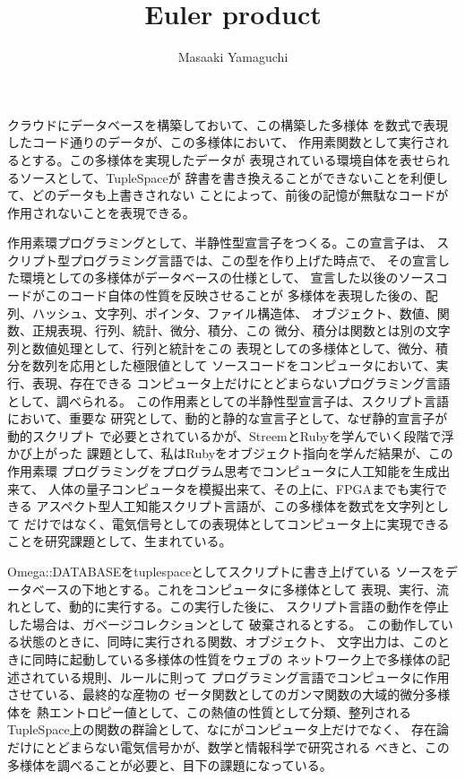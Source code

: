 \documentclass{jsarticle}
\begin{document}
\title{Euler product}
\author{Masaaki Yamaguchi}
\date{}
\maketitle



  クラウドにデータベースを構築しておいて、この構築した多様体
  を数式で表現したコード通りのデータが、この多様体において、
  作用素関数として実行されるとする。この多様体を実現したデータが
  表現されている環境自体を表せられるソースとして、TupleSpaceが
  辞書を書き換えることができないことを利便して、どのデータも上書きされない
  ことによって、前後の記憶が無駄なコードが作用されないことを表現できる。

  作用素環プログラミングとして、半静性型宣言子をつくる。この宣言子は、
  スクリプト型プログラミング言語では、この型を作り上げた時点で、
  その宣言した環境としての多様体がデータベースの仕様として、
  宣言した以後のソースコードがこのコード自体の性質を反映させることが
  多様体を表現した後の、配列、ハッシュ、文字列、ポインタ、ファイル構造体、
  オブジェクト、数値、関数、正規表現、行列、統計、微分、積分、この
  微分、積分は関数とは別の文字列と数値処理として、行列と統計をこの
  表現としての多様体として、微分、積分を数列を応用とした極限値として
  ソースコードをコンピュータにおいて、実行、表現、存在できる
  コンピュータ上だけにとどまらないプログラミング言語として、調べられる。
  この作用素としての半静性型宣言子は、スクリプト言語において、重要な
  研究として、動的と静的な宣言子として、なぜ静的宣言子が動的スクリプト
  で必要とされているかが、StreemとRubyを学んでいく段階で浮かび上がった
  課題として、私はRubyをオブジェクト指向を学んだ結果が、この作用素環
  プログラミングをプログラム思考でコンピュータに人工知能を生成出来て、
  人体の量子コンピュータを模擬出来て、その上に、FPGAまでも実行できる
  アスペクト型人工知能スクリプト言語が、この多様体を数式を文字列として
  だけではなく、電気信号としての表現体としてコンピュータ上に実現できる
  ことを研究課題として、生まれている。


  Omega::DATABASEをtuplespaceとしてスクリプトに書き上げている
  ソースをデータベースの下地とする。これをコンピュータに多様体として
  表現、実行、流れとして、動的に実行する。この実行した後に、
  スクリプト言語の動作を停止した場合は、ガベージコレクションとして
  破棄されるとする。
  この動作している状態のときに、同時に実行される関数、オブジェクト、
  文字出力は、このときに同時に起動している多様体の性質をウェブの
  ネットワーク上で多様体の記述されている規則、ルールに則って
  プログラミング言語でコンピュータに作用させている、最終的な産物の
  ゼータ関数としてのガンマ関数の大域的微分多様体を
  熱エントロピー値として、この熱値の性質として分類、整列される
  TupleSpace上の関数の群論として、なにがコンピュータ上だけでなく、
  存在論だけにとどまらない電気信号かが、数学と情報科学で研究される
  べきと、この多様体を調べることが必要と、目下の課題になっている。
\end{document}
